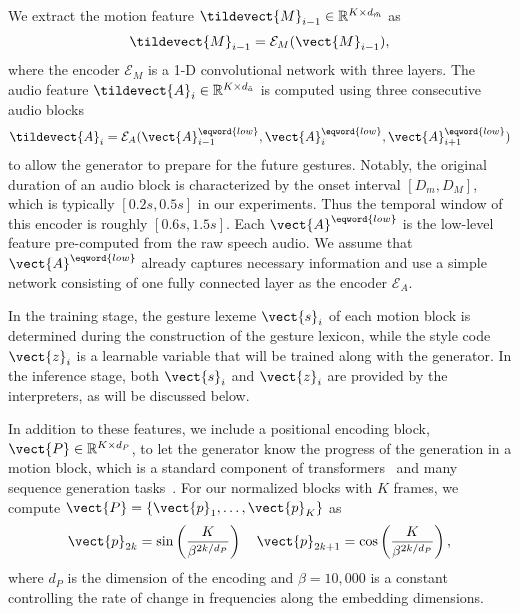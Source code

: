 We extract the motion feature $\tildevect{M}_{i-1}\in\mathbb{R}^{K\times{}d_{\tilde{m}}}$ as 
\begin{equation}
    \tildevect{M}_{i-1} = \mathcal{E}_M(\vect{M}_{i-1}),
\end{equation}
where the encoder $\mathcal{E}_M$ is a 1-D convolutional network with three layers.
%
The audio feature $\tildevect{A}_{i}\in\mathbb{R}^{K\times{}d_{\tilde{a}}}$ is computed using three consecutive audio blocks
\begin{equation}
    \tildevect{A}_{i} = \mathcal{E}_A(\vect{A}^{\eqword{low}}_{i-1},\vect{A}^{\eqword{low}}_{i},\vect{A}^{\eqword{low}}_{i+1})
\end{equation}
to allow the generator to prepare for the future gestures. 
Notably, the original duration of an audio block is characterized by the onset interval $[D_m, D_M]$, which is typically $[0.2s, 0.5s]$ in our experiments. Thus the temporal window of this encoder is roughly $[0.6s, 1.5s]$.
Each $\vect{A}^{\eqword{low}}$ is the low-level feature pre-computed from the raw speech audio. We assume that $\vect{A}^{\eqword{low}}$ already captures necessary information and use a simple network consisting of one fully connected layer as the encoder $\mathcal{E}_A$.

In the training stage, the gesture lexeme $\vect{s}_i$ of each motion block is determined during the construction of the gesture lexicon, while the style code $\vect{z}_i$ is a learnable variable that will be trained along with the generator. In the inference stage, both $\vect{s}_i$ and $\vect{z}_i$ are provided by the interpreters, as will be discussed below.

In addition to these features, we include a positional encoding block, $\vect{P}\in\mathbb{R}^{K\times{}d_{P}}$, to let the generator know the progress of the generation in a motion block, which is a standard component of transformers~\citep{Vaswani2017_Attentiona} and many sequence generation tasks~\citep{Harvey2020_motionInBetween}. For our normalized blocks with $K$ frames, we compute $\vect{P}=\{\vect{p}_1,\dots,\vect{p}_K\}$ as
\begin{align}
    \vect{p}_{2k} = \sin\left(\frac{K}{\beta^{2k/d_{P}}}\right) \quad
    \vect{p}_{2k+1} = \cos\left(\frac{K}{\beta^{2k/d_{P}}}\right),
    \label{eqn:pos_enc}
\end{align}
where $d_{P}$ is the dimension of the encoding and $\beta=10,000$ is a constant controlling the rate of change in frequencies along the embedding dimensions.


